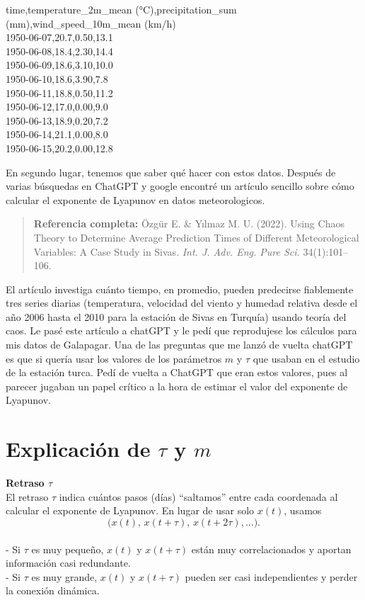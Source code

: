 \documentclass[
  10pt,
  a4paper,
  DIV=11,
  numbers=noendperiod,
  open=any]{scrreprt}
\numberwithin{equation}{chapter}
\numberwithin{equation}{section}
\renewcommand{\[}{\begin{equation}}
\renewcommand{\]}{\end{equation}}
\begin{document}
time,temperature\_2m\_mean (°C),precipitation\_sum
(mm),wind\_speed\_10m\_mean (km/h)\\
1950-06-07,20.7,0.50,13.1\\
1950-06-08,18.4,2.30,14.4\\
1950-06-09,18.6,3.10,10.0\\
1950-06-10,18.6,3.90,7.8\\
1950-06-11,18.8,0.50,11.2\\
1950-06-12,17.0,0.00,9.0\\
1950-06-13,18.9,0.20,7.2\\
1950-06-14,21.1,0.00,8.0\\
1950-06-15,20.2,0.00,12.8

En segundo lugar, tenemos que saber qué hacer con estos datos. Después
de varias búsquedas en ChatGPT y google encontré un artículo sencillo
sobre cómo calcular el exponente de Lyapunov en datos meteorologicos.

\begin{quote}
\textbf{Referencia completa:} Özgür E. \& Yılmaz M. U. (2022). Using
Chaos Theory to Determine Average Prediction Times of Different
Meteorological Variables: A Case Study in Sivas. \emph{Int. J. Adv. Eng.
Pure Sci.} 34(1):101--106.
\end{quote}

El artículo investiga cuánto tiempo, en promedio, pueden predecirse
fiablemente tres series diarias (temperatura, velocidad del viento y
humedad relativa desde el año 2006 hasta el 2010 para la estación de
Sivas en Turquía) usando teoría del caos. Le pasé este artículo a
chatGPT y le pedí que reprodujese los cálculos para mis datos de
Galapagar. Una de las preguntas que me lanzó de vuelta chatGPT es que si
quería usar los valores de los parámetros \(m\) y \(\tau\) que usaban en
el estudio de la estación turca. Pedí de vuelta a ChatGPT que eran estos
valores, pues al parecer jugaban un papel crítico a la hora de estimar
el valor del exponente de Lyapunov.

\section{\texorpdfstring{Explicación de \(\tau\) y
\(m\)}{Explicación de \textbackslash tau y m}}\label{explicaciuxf3n-de-tau-y-m}

\textbf{Retraso \(\tau\)}\\
El retraso \(\tau\) indica cuántos pasos (días) ``saltamos'' entre cada
coordenada al calcular el exponente de Lyapunov. En lugar de usar solo
\(x(t)\), usamos\\
\[
\bigl(x(t),\,x(t+\tau),\,x(t+2\tau),\dots\bigr).
\]\\
- Si \(\tau\) es muy pequeño, \(x(t)\) y \(x(t+\tau)\) están muy
correlacionados y aportan información casi redundante.\\
- Si \(\tau\) es muy grande, \(x(t)\) y \(x(t+\tau)\) pueden ser casi
independientes y perder la conexión dinámica.
\end{document}
